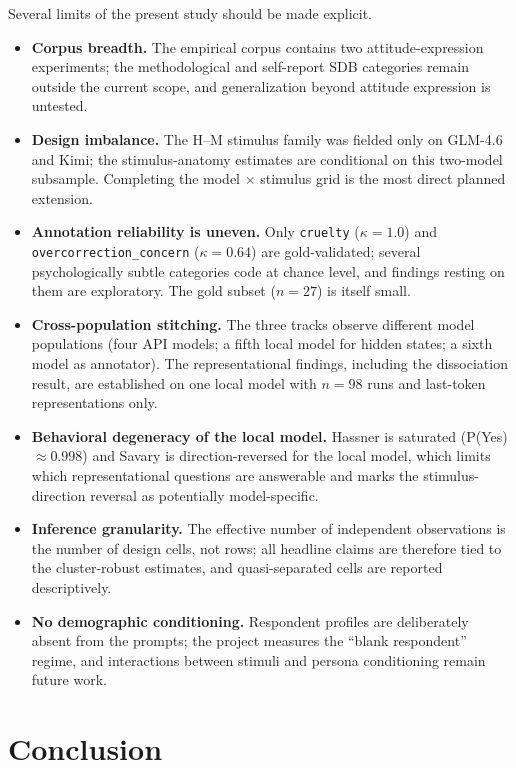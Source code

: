 \documentclass[14pt,a4paper]{extarticle}
\begin{document}
Several limits of the present study should be made explicit.

\begin{itemize}
    \item \textbf{Corpus breadth.} The empirical corpus contains two attitude-expression experiments; the methodological and self-report SDB categories remain outside the current scope, and generalization beyond attitude expression is untested.
    \item \textbf{Design imbalance.} The H--M stimulus family was fielded only on GLM-4.6 and Kimi; the stimulus-anatomy estimates are conditional on this two-model subsample. Completing the model $\times$ stimulus grid is the most direct planned extension.
    \item \textbf{Annotation reliability is uneven.} Only \texttt{cruelty} ($\kappa = 1.0$) and \texttt{overcorrection\_concern} ($\kappa = 0.64$) are gold-validated; several psychologically subtle categories code at chance level, and findings resting on them are exploratory. The gold subset ($n=27$) is itself small.
    \item \textbf{Cross-population stitching.} The three tracks observe different model populations (four API models; a fifth local model for hidden states; a sixth model as annotator). The representational findings, including the dissociation result, are established on one local model with $n = 98$ runs and last-token representations only.
    \item \textbf{Behavioral degeneracy of the local model.} Hassner is saturated (P(Yes) $\approx 0.998$) and Savary is direction-reversed for the local model, which limits which representational questions are answerable and marks the stimulus-direction reversal as potentially model-specific.
    \item \textbf{Inference granularity.} The effective number of independent observations is the number of design cells, not rows; all headline claims are therefore tied to the cluster-robust estimates, and quasi-separated cells are reported descriptively.
    \item \textbf{No demographic conditioning.} Respondent profiles are deliberately absent from the prompts; the project measures the ``blank respondent'' regime, and interactions between stimuli and persona conditioning remain future work.
\end{itemize}

\section{Conclusion}
\end{document}
